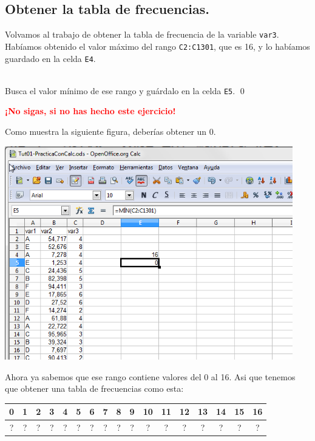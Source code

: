 \documentclass[10pt,a4paper]{article}\usepackage[]{graphicx}\usepackage[]{color}
\newcounter {cont01}
\newcounter{EjercicioI}
\begin{document}
\subsection*{Obtener la tabla de frecuencias.}

Volvamos al trabajo de obtener la tabla de frecuencia de la variable {\tt var3}. Habíamos obtenido el valor máximo del rango {\tt C2:C1301}, que es 16, y lo habíamos guardado en la celda {\tt E4}.


\begin{ejercicio}
\quad\\
Busca el valor mínimo de ese rango y guárdalo en la celda {\tt E5}.
\qed
\end{ejercicio}

\vspace{8cm}

\begin{center}
\textcolor{red}{\LARGE\bf  ¡No sigas, si no has hecho este ejercicio!}
\end{center}


\newpage

Como muestra la siguiente figura, deberías obtener un 0.
    \begin{center}
    \includegraphics[height=9.3cm]{../fig/Tut01-Calc-tablaFrec-10.png}
    \end{center}
Ahora ya sabemos que ese rango contiene valores del 0 al 16. Asi que tenemos que obtener una tabla de frecuencias como esta:
\begin{center}
\begin{tabular}{|c|c|c|c|c|c|c|c|c|c|c|c|c|c|c|c|c|}
0&1&2&3&4&5&6&7&8&9&10&11&12&13&14&15&16\\
\hline
?&?&?&?&?&?&?&?&?&?&?&?&?&?&?&?&?
\end{tabular}
\end{center}
\end{document}
